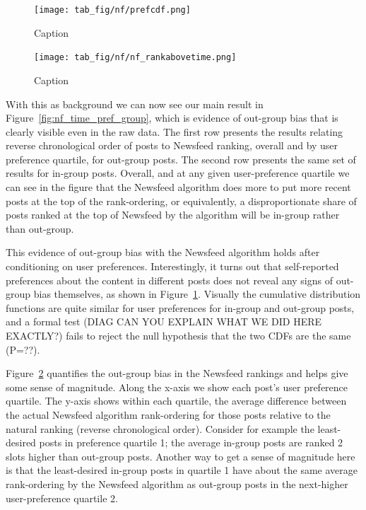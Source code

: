 \documentclass[12pt,letterpaper]{article}
\begin{document}
\begin{figure}[h]
    \centering
    \texttt{[image: tab\_fig/nf/prefcdf.png]}
    \caption{Caption}
    \label{fig:prefcdf}
\end{figure}


\begin{figure}[h]
    \centering
    \texttt{[image: tab\_fig/nf/nf\_rankabovetime.png]}
    \caption{Caption}
    \label{fig:rankabovetime}
\end{figure}

With this as background we can now see our main result in Figure~\ref{fig:nf_time_pref_group}, which is evidence of out-group bias that is clearly visible even in the raw data. The first row presents the results relating reverse chronological order of posts to Newsfeed ranking, overall and by user preference quartile, for out-group posts. The second row presents the same set of results for in-group posts. Overall, and at any given user-preference quartile we can see in the figure that the Newsfeed algorithm does more to put more recent posts at the top of the rank-ordering, or equivalently, a disproportionate share of posts ranked at the top of Newsfeed by the algorithm will be in-group rather than out-group.

This evidence of out-group bias with the Newsfeed algorithm holds after conditioning on user preferences. Interestingly, it turns out that self-reported preferences about the content in different posts does not reveal any signs of out-group bias themselves, as shown in Figure~\ref{fig:prefcdf}. Visually the cumulative distribution functions are quite similar for user preferences for in-group and out-group posts, and a formal test (DIAG CAN YOU EXPLAIN WHAT WE DID HERE EXACTLY?) fails to reject the null hypothesis that the two CDFs are the same (P=??).

Figure~\ref{fig:rankabovetime} quantifies the out-group bias in the Newsfeed rankings and helps give some sense of magnitude. Along the x-axis we show each post's user preference quartile. The y-axis shows within each quartile, the average difference between the actual Newsfeed algorithm rank-ordering for those posts relative to the natural ranking (reverse chronological order). Consider for example the least-desired posts in preference quartile 1; the average in-group posts are ranked 2 slots higher than out-group posts. Another way to get a sense of magnitude here is that the least-desired in-group posts in quartile 1 have about the same average rank-ordering by the Newsfeed algorithm as out-group posts in the next-higher user-preference quartile 2.
\end{document}
